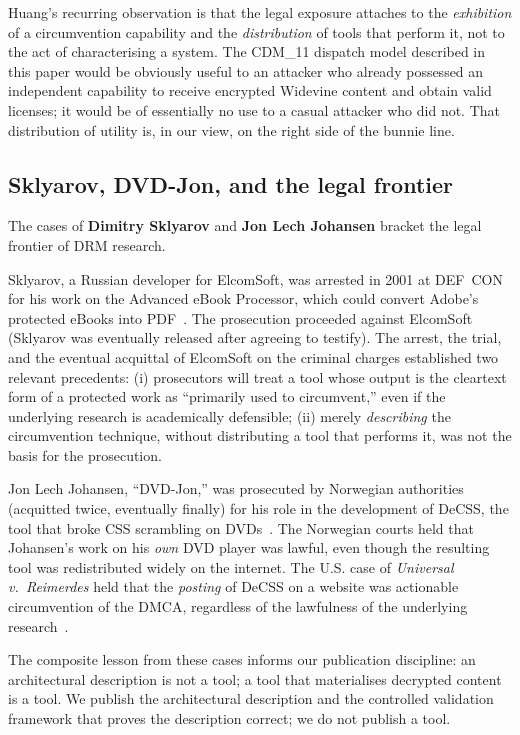 \documentclass[11pt,letterpaper]{article}
\begin{document}
Huang's recurring observation is that the legal exposure attaches
to the \emph{exhibition} of a circumvention capability and the
\emph{distribution} of tools that perform it, not to the act of
characterising a system. The CDM\_11 dispatch model described in
this paper would be obviously useful to an attacker who already
possessed an independent capability to receive encrypted Widevine
content and obtain valid licenses; it would be of essentially no
use to a casual attacker who did not. That distribution of utility
is, in our view, on the right side of the bunnie line.

\subsection{Sklyarov, DVD-Jon, and the legal frontier}
\label{sec:ante-legal}

The cases of \textbf{Dimitry Sklyarov} and \textbf{Jon Lech
Johansen} bracket the legal frontier of DRM research.

Sklyarov, a Russian developer for ElcomSoft, was arrested in 2001
at DEF~CON for his work on the Advanced eBook Processor, which
could convert Adobe's protected eBooks into PDF~\cite{sklyarov-case}.
The prosecution proceeded against ElcomSoft (Sklyarov was eventually
released after agreeing to testify). The arrest, the trial, and the
eventual acquittal of ElcomSoft on the criminal charges established
two relevant precedents: (i) prosecutors will treat a tool whose
output is the cleartext form of a protected work as
``primarily used to circumvent,'' even if the underlying research is
academically defensible; (ii) merely \emph{describing} the
circumvention technique, without distributing a tool that performs
it, was not the basis for the prosecution.

Jon Lech Johansen, ``DVD-Jon,'' was prosecuted by Norwegian
authorities (acquitted twice, eventually finally) for his role in
the development of DeCSS, the tool that broke CSS scrambling on
DVDs~\cite{dvdjon-norway}. The Norwegian courts held that
Johansen's work on his \emph{own} DVD player was lawful, even
though the resulting tool was redistributed widely on the
internet. The U.S. case of \emph{Universal v.~Reimerdes} held that
the \emph{posting} of DeCSS on a website was actionable circumvention
of the DMCA, regardless of the lawfulness of the underlying
research~\cite{decss-2600}.

The composite lesson from these cases informs our publication
discipline: an architectural description is not a tool; a tool that
materialises decrypted content is a tool. We publish the
architectural description and the controlled validation framework
that proves the description correct; we do not publish a tool.
\end{document}
